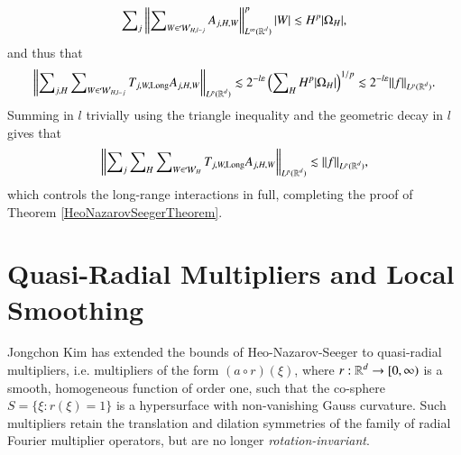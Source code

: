 %
\begin{equation}
  \sum\nolimits_j \left\| \sum\nolimits_{W \in \mathcal{W}_{H,l-j}} A_{j,H,W} \right\|_{L^\infty(\operatorname{\mathbb{R}}^d)}^p |W| \lesssim H^p |\Omega_H|,
\end{equation}
%
and thus that
%
\begin{equation}
  \left\| \sum\nolimits_{j,H} \sum\nolimits_{W \in \mathcal{W}_{H,l-j}} T_{j,W,\text{Long}} A_{j,H,W} \right\|_{L^p(\operatorname{\mathbb{R}}^d)} \lesssim 2^{-l \varepsilon} \left( \sum\nolimits_H H^p |\Omega_H| \right)^{1/p} \lesssim 2^{-l\varepsilon} \| f \|_{L^p(\operatorname{\mathbb{R}}^d)}.
\end{equation}
%
Summing in $l$ trivially using the triangle inequality and the geometric decay in $l$ gives that
%
\begin{equation}
  \left\| \sum\nolimits_j \sum\nolimits_H \sum\nolimits_{W \in \mathcal{W}_{H}} T_{j,W,\text{Long}} A_{j,H,W} \right\|_{L^p(\operatorname{\mathbb{R}}^d)} \lesssim \| f \|_{L^p(\operatorname{\mathbb{R}}^d)},
\end{equation}
%
which controls the long-range interactions in full, completing the proof of Theorem \ref{HeoNazarovSeegerTheorem}.

%
%






\section{Quasi-Radial Multipliers and Local Smoothing}

Jongchon Kim \cite{KimQuasiradial} has extended 
the bounds of Heo-Nazarov-Seeger to quasi-radial multipliers, i.e. multipliers of the form $(a \circ r)(\xi)$, where $r: \operatorname{\mathbb{R}}^d \to [0,\infty)$ is a smooth, homogeneous function of order one, such that the co-sphere $S = \{ \xi : r(\xi) = 1 \}$ is a hypersurface with non-vanishing Gauss curvature. Such multipliers retain the translation and dilation symmetries of the family of radial Fourier multiplier operators, but are no longer \emph{rotation-invariant}.

